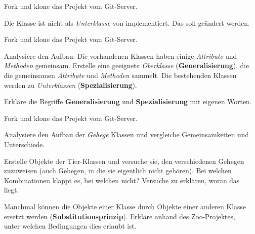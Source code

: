 \documentclass[10pt, a4paper]{arbeitsblatt}
\begin{document}
\ReiheTitel

\begin{aufgabe}[icon=\iconComputer]
	Fork und klone das Projekt  vom Git-Server.

	Die Klasse  ist nicht als \emph{Unterklasse} von  implementiert. Das soll geändert werden.
\end{aufgabe}

\begin{aufgabe}[icon=\iconComputer]
	Fork und klone das Projekt  vom Git-Server.

	Analysiere den Aufbau. Die vorhandenen Klassen haben einige \emph{Attribute} und \emph{Methoden} gemeinsam. Erstelle eine geeignete \emph{Oberklasse} (\textbf{Generalisierung}), die die gemeinsamen \emph{Attribute} und \emph{Methoden} sammelt. Die bestehenden Klassen werden zu \emph{Unterklassen} (\textbf{Spezialisierung}).

	Erkläre die Begriffe \textbf{Generalisierung} und \textbf{Spezialisierung} mit eigenen Worten.
\end{aufgabe}

\begin{aufgabe}[icon=\iconComputer]
	Fork und klone das Projekt  vom Git-Server.

	Analysiere den Aufbau der \emph{Gehege} Klassen und vergleiche Gemeinsamkeiten und Unterschiede.

	Erstelle Objekte der Tier-Klassen und versuche sie, den verschiedenen Gehegen zuzuweisen (auch Gehegen, in die sie eigentlich nicht gehören). Bei welchen Kombinationen klappt es, bei welchen nicht? Versuche zu erklären, woran das liegt.

	Manchmal können die Objekte einer Klasse durch Objekte einer anderen Klasse ersetzt werden (\textbf{Substitutionsprinzip}). Erkläre anhand des Zoo-Projektes, unter welchen Bedingungen dies erlaubt ist.
\end{aufgabe}
\end{document}
